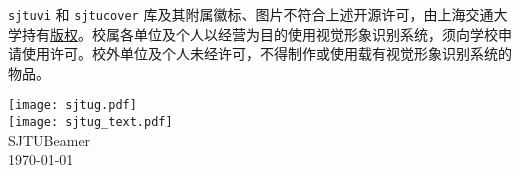 \documentclass[
    UTF8,
    heading=true,
    12pt,
    a4paper
]{ctexrep}
\def\themename{\textsf{SJTUBeamer}}
\begin{document}
\texttt{sjtuvi} 和 \texttt{sjtucover} 库及其附属徽标、图片不符合上述开源许可，由上海交通大学持有\href{https://vi.sjtu.edu.cn/index.php/articles/bulletin/16}{版权}。校属各单位及个人以经营为目的使用视觉形象识别系统，须向学校申请使用许可。校外单位及个人未经许可，不得制作或使用载有视觉形象识别系统的物品。

\def\sjtuglogo{
  \texttt{[image: sjtug.pdf]}\\
  \vspace*{5pt}
  \texttt{[image: sjtug\_text.pdf]}
}

\vfill
{
\centering
\sjtuglogo\\
{\large \themename{}\\}
\today\\
}
\vfill
\end{document}
